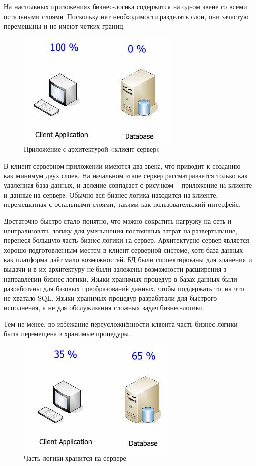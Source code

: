 \documentclass[14pt, a4paper]{extreport}
\begin{document}
На настольных приложениях бизнес-логика содержится на одном звене со всеми остальными слоями. Поскольку нет необходимости разделять слои, они зачастую перемешаны и не имеют четких границ.

\begin{figure}[!htb]
  \centering
    \includegraphics[scale=0.6]{../shared_images/business-logic/client-server.jpg}
   \caption{Приложение с архитектурой «клиент-сервер»}
    \label{fig:start}
\end{figure}


В клиент-серверном приложении имеются два звена, что приводит к созданию как минимум двух слоев. На начальном этапе сервер рассматривается только как удаленная база данных, и деление совпадает с рисунком -- приложение на клиенте и данные на сервере. Обычно вся бизнес-логика находится на клиенте, перемешанная с остальными слоями, такими как пользовательский интерфейс.

Достаточно быстро стало понятно, что можно сократить нагрузку на сеть и централизовать логику для уменьшения постоянных затрат на развертывание, перенеся большую часть бизнес-логики на сервер. Архитектурно сервер является хорошо подготовленным местом в клиент-серверной системе, хотя база данных как платформа даёт мало возможностей. БД были спроектированы для хранения и выдачи и в их архитектуру не были заложены возможности расширения в направлении бизнес-логики. Языки хранимых процедур в базах данных были разработаны для базовых преобразований данных, чтобы поддержать то, на что не хватало SQL. Языки хранимых процедур разработали для быстрого исполнения, а не для обслуживания сложных задач бизнес-логики.

Тем не менее, во избежание переусложнённости клиента часть бизнес-логики была перемещена в хранимые процедуры.

\begin{figure}[!htb]
  \centering
    \includegraphics[scale=0.6]{../shared_images/business-logic/client-server-2.jpg}
   \caption{Часть логики хранится на сервере}
    \label{fig:start}
\end{figure}
\end{document}
